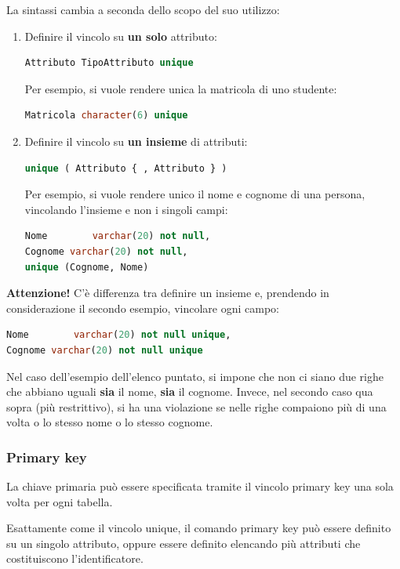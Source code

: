 \documentclass[a4paper]{article}
\begin{document}
	\noindent
	La sintassi cambia a seconda dello scopo del suo utilizzo:
	\begin{enumerate}
		\item Definire il vincolo su \textbf{un solo} attributo:
\begin{lstlisting}[language=SQL]
Attributo TipoAttributo unique\end{lstlisting}
		Per esempio, si vuole rendere unica la matricola di uno studente:
\begin{lstlisting}[language=SQL]
Matricola character(6) unique\end{lstlisting}

		\item Definire il vincolo su \textbf{un insieme} di attributi:
\begin{lstlisting}[language=SQL]
unique ( Attributo { , Attributo } )\end{lstlisting}
		Per esempio, si vuole rendere unico il nome e cognome di una persona, vincolando l'insieme e non i singoli campi:
\begin{lstlisting}[language=SQL]
Nome 		varchar(20) not null,
Cognome varchar(20) not null,
unique (Cognome, Nome)\end{lstlisting}
	\end{enumerate}
	\textcolor{Red3}{\textbf{Attenzione!}} C'è differenza tra definire un insieme e, prendendo in considerazione il secondo esempio, vincolare ogni campo:
\begin{lstlisting}[language=SQL]
Nome 		varchar(20) not null unique,
Cognome varchar(20) not null unique\end{lstlisting}
	Nel caso dell'esempio dell'elenco puntato, si impone che non ci siano due righe che abbiano uguali \textbf{sia} il nome, \textbf{sia} il cognome. Invece, nel secondo caso qua sopra (più restrittivo), si ha una violazione se nelle righe compaiono più di una volta o lo stesso nome o lo stesso cognome.\newpage
	
	\subsubsection{\textsf{Primary key}}

	La chiave primaria può essere specificata tramite il vincolo \textsf{primary key} una sola volta per ogni tabella.

	Esattamente come il vincolo \textsf{unique}, il comando \textsf{primary key} può essere definito su un singolo attributo, oppure essere definito elencando più attributi che costituiscono l'identificatore.
\end{document}
